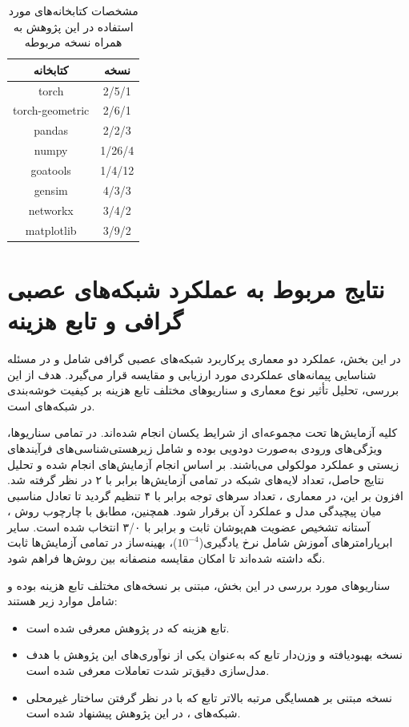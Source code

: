 \begin{table}[h]
	\centering
	\caption{مشخصات کتابخانه‌های مورد استفاده در این پژوهش به همراه نسخه مربوطه}
	\label{table:python-libraries}
	\vspace{3mm}
	\begin{tabular}{| c | c |}
		\hline
		کتابخانه & نسخه \\
		\hline
		torch & 2/5/1 \\
		torch-geometric & 2/6/1 \\
		pandas & 2/2/3 \\
		numpy & 1/26/4 \\
		goatools & 1/4/12 \\
		gensim & 4/3/3 \\
		networkx & 3/4/2 \\
		matplotlib & 3/9/2 \\
		\hline

	\end{tabular}
\end{table}

\section{نتایج مربوط به عملکرد شبکه‌های عصبی گرافی و تابع هزینه}

در این بخش، عملکرد دو معماری پرکاربرد شبکه‌های عصبی گرافی شامل  و  در مسئله شناسایی پیمانه‌های عملکردی مورد ارزیابی و مقایسه قرار می‌گیرد. هدف از این بررسی، تحلیل تأثیر نوع معماری و سناریو‌های مختلف تابع هزینه بر کیفیت خوشه‌بندی در شبکه‌های  است.

کلیه آزمایش‌ها تحت مجموعه‌ای از شرایط یکسان انجام شده‌اند. در تمامی سناریو‌ها، ویژگی‌های ورودی به‌صورت دودویی بوده و شامل زیرهستی‌شناسی‌های فرآیندهای زیستی و عملکرد مولکولی می‌باشند. بر اساس انجام آزمایش‌های انجام شده و تحلیل نتایج حاصل، تعداد لایه‌های شبکه در تمامی آزمایش‌ها برابر با ۲ در نظر گرفته شد. افزون بر این، در معماری ، تعداد سرهای توجه برابر با ۴ تنظیم گردید تا تعادل مناسبی میان پیچیدگی مدل و عملکرد آن برقرار شود. همچنین، مطابق با چارچوب روش ، آستانه تشخیص عضویت هم‌پوشان ثابت و برابر با ۳/۰ انتخاب شده است. سایر ابرپارامترهای آموزش شامل نرخ یادگیری($10^{-4}$)، بهینه‌ساز  در تمامی آزمایش‌ها ثابت نگه داشته شده‌اند تا امکان مقایسه منصفانه بین روش‌ها فراهم شود. 


سناریو‌های مورد بررسی در این بخش، مبتنی بر نسخه‌های مختلف تابع هزینه  بوده و شامل موارد زیر هستند:
\begin{itemize}
	\item تابع هزینه  که در پژوهش \cite{nocd2019} معرفی شده‌ است.
	\item نسخه بهبود‌یافته و وزن‌دار تابع  که به‌عنوان یکی از نوآوری‌های این پژوهش با هدف مدل‌سازی دقیق‌تر شدت تعاملات معرفی شده است.
	\item نسخه مبتنی بر همسایگی مرتبه بالاتر تابع  که با در نظر گرفتن ساختار غیرمحلی شبکه‌های ، در این پژوهش پیشنهاد شده است.
\end{itemize}

